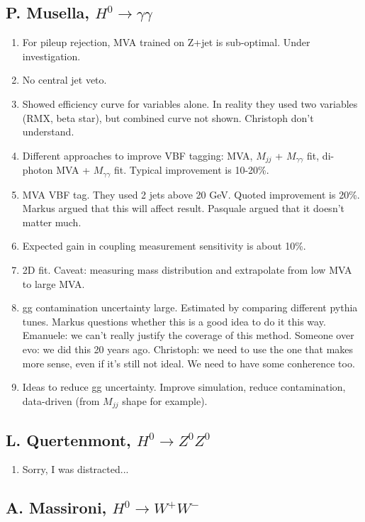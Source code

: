 \documentclass{fheadnote}
\begin{document}
\subsection{P. Musella, $H^0 \rightarrow \gamma\gamma$}

\begin{enumerate}
\item For pileup rejection, MVA trained on Z+jet is sub-optimal.  Under investigation.
\item No central jet veto.
\item Showed efficiency curve for variables alone.  In reality they used two variables (RMX, beta star),
   but combined curve not shown.   Christoph don't understand.
\item Different approaches to improve VBF tagging:  MVA, $M_{jj}$ + $M_{\gamma\gamma}$ fit, di-photon MVA + $M_{\gamma\gamma}$ fit.  Typical improvement is 10-20\%.
\item MVA VBF tag.  They used 2 jets above 20 GeV.  Quoted improvement is 20\%.
   Markus argued that this will affect result.
   Pasquale argued that it doesn't matter much.
\item Expected gain in coupling measurement sensitivity is about 10\%.
\item 2D fit.  Caveat: measuring mass distribution and extrapolate from low MVA to large MVA.
\item gg contamination uncertainty large.  Estimated by comparing different {\sc pythia} tunes.
   Markus questions whether this is a good idea to do it this way.
   Emanuele: we can't really justify the coverage of this method.
   Someone over evo: we did this 20 years ago.
   Christoph: we need to use the one that makes more sense, even if it's still not ideal.  We need to have some conherence too.
\item Ideas to reduce gg uncertainty.  Improve simulation, reduce contamination, data-driven (from $M_{jj}$ shape for example).
\end{enumerate}

\subsection{L. Quertenmont, $H^0 \rightarrow Z^0Z^0$}

\begin{enumerate}
\item Sorry, I was distracted...
\end{enumerate}

\subsection{A. Massironi, $H^0 \rightarrow W^+W^-$}
\end{document}
